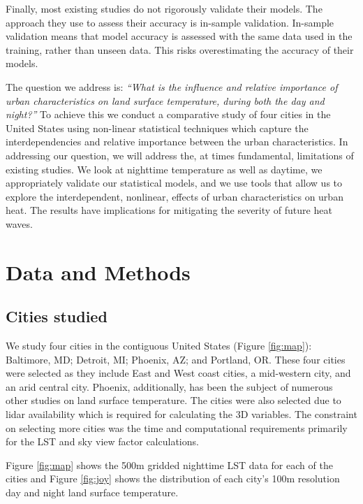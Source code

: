 \documentclass[final,3p,times,twocolumn,sort&compress]{elsarticle}
\begin{document}
Finally, most existing studies do not rigorously validate their models.
The approach they use to assess their accuracy is in-sample validation.
In-sample validation means that model accuracy is assessed with the same data used in the training, rather than unseen data. 
This risks overestimating the accuracy of their models.

The question we address is: \textit{``What is the influence and relative importance of urban characteristics on land surface temperature, during both the day and night?''}
To achieve this we conduct a comparative study of four cities in the United States using non-linear statistical techniques which capture the interdependencies and relative importance between the urban characteristics.
In addressing our question, we will address the, at times fundamental, limitations of existing studies.
We look at nighttime temperature as well as daytime, we appropriately validate our statistical models, and we use tools that allow us to explore the interdependent, nonlinear, effects of urban characteristics on urban heat.
The results have implications for mitigating the severity of future heat waves.

\section{Data and Methods}
\subsection{Cities studied}

We study four cities in the contiguous United States (Figure \ref{fig:map}): Baltimore, MD; Detroit, MI; Phoenix, AZ; and Portland, OR. These four cities were selected as they include East and West coast cities, a mid-western city, and an arid central city. Phoenix, additionally, has been the subject of numerous other studies on land surface temperature. The cities were also selected due to lidar availability which is required for calculating the 3D variables. The constraint on selecting more cities was the time and computational requirements primarily for the LST and sky view factor calculations. 

Figure \ref{fig:map} shows the 500m gridded nighttime LST data for each of the cities and Figure \ref{fig:joy} shows the distribution of each city's 100m resolution day and night land surface temperature. 
\end{document}
